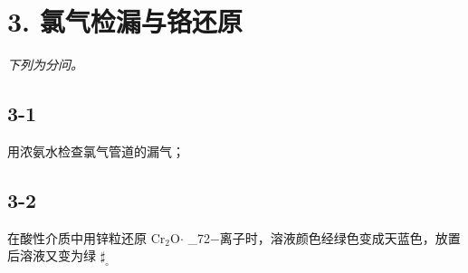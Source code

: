 \section*{3. 氯气检漏与铬还原}
\textit{下列为分问。}

\subsection*{3-1}
⽤浓氨⽔检查氯⽓管道的漏⽓；

\subsection*{3-2}
在酸性介质中⽤锌粒还原 $\mathrm { { C r _ { 2 } O } } \mathrm { { \cdot } }$ _{7}2−离⼦时，溶液颜⾊经绿⾊变成天蓝⾊，放置后溶液⼜变为绿 $\sharp _ { \circ }$
